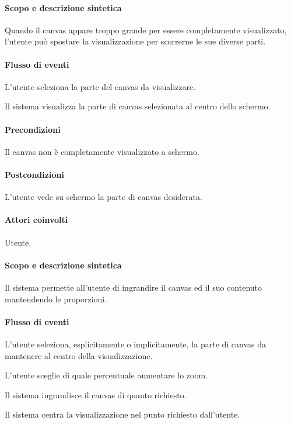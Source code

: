 \paragraph{Scopo e descrizione sintetica}
Quando il canvas appare troppo grande per essere completamente visualizzato, l'utente pu\`o spostare la visualizzazione per scorrerne le sue diverse parti.
\paragraph{Flusso di eventi}
\begin{elenconumerato}[\textbf{}]{\subsubsecindent}
\item L'utente seleziona la parte del canvas da visualizzare.
\item Il sistema visualizza la parte di canvas selezionata al centro dello schermo.
\end{elenconumerato}
\paragraph{Precondizioni} Il canvas non \`e completamente visualizzato a schermo.
\paragraph{Postcondizioni} L'utente vede su schermo la parte di canvas desiderata.

\paragraph{Attori coinvolti} Utente.
\paragraph{Scopo e descrizione sintetica} 
Il sistema permette all'utente di ingrandire il canvas ed il suo contenuto mantendendo le proporzioni.
\paragraph{Flusso di eventi}
\begin{elenconumerato}[\textbf{}]{\subsubsecindent}
\item L'utente seleziona, esplicitamente o implicitamente, la parte di canvas da mantenere al centro della visualizzazione.
\item L'utente sceglie di quale percentuale aumentare lo zoom.
\item Il sistema ingrandisce il canvas di quanto richiesto.
\item Il sistema centra la visualizzazione nel punto richiesto dall'utente.
\end{elenconumerato}
